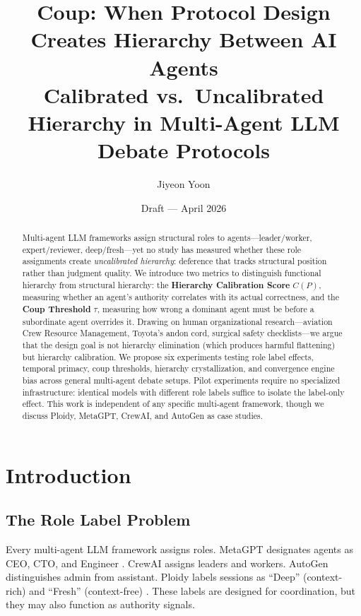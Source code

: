 \documentclass[11pt]{article}
\title{Coup: When Protocol Design Creates Hierarchy Between AI Agents\\
\large Calibrated vs.\ Uncalibrated Hierarchy in Multi-Agent LLM Debate Protocols}
\author{Jiyeon Yoon}
\date{Draft --- April 2026}
\theoremstyle{definition}
\begin{document}
\maketitle

\begin{abstract}
Multi-agent LLM frameworks assign structural roles to agents---leader/worker, expert/reviewer, deep/fresh---yet no study has measured whether these role assignments create \emph{uncalibrated hierarchy}: deference that tracks structural position rather than judgment quality. We introduce two metrics to distinguish functional hierarchy from structural hierarchy: the \textbf{Hierarchy Calibration Score} $C(P)$, measuring whether an agent's authority correlates with its actual correctness, and the \textbf{Coup Threshold} $\tau$, measuring how wrong a dominant agent must be before a subordinate agent overrides it. Drawing on human organizational research---aviation Crew Resource Management, Toyota's andon cord, surgical safety checklists---we argue that the design goal is not hierarchy elimination (which produces harmful flattening) but hierarchy calibration. We propose six experiments testing role label effects, temporal primacy, coup thresholds, hierarchy crystallization, and convergence engine bias across general multi-agent debate setups. Pilot experiments require no specialized infrastructure: identical models with different role labels suffice to isolate the label-only effect. This work is independent of any specific multi-agent framework, though we discuss Ploidy, MetaGPT, CrewAI, and AutoGen as case studies.
\end{abstract}

\section{Introduction}
\label{sec:intro}

\subsection{The Role Label Problem}

Every multi-agent LLM framework assigns roles. MetaGPT designates agents as CEO, CTO, and Engineer \citep{hong2024metagpt}. CrewAI assigns leaders and workers. AutoGen distinguishes admin from assistant. Ploidy labels sessions as ``Deep'' (context-rich) and ``Fresh'' (context-free) \citep{yoon2026ploidy}. These labels are designed for coordination, but they may also function as authority signals.
\end{document}
